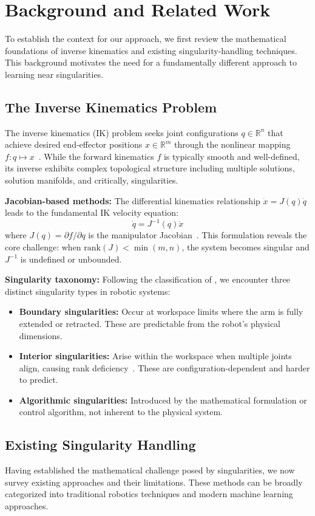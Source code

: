 \documentclass[twoside,11pt]{article}
\begin{document}
\section{Background and Related Work}
\label{sec:background}
To establish the context for our approach, we first review the mathematical foundations of inverse kinematics and existing singularity-handling techniques. This background motivates the need for a fundamentally different approach to learning near singularities.

\subsection{The Inverse Kinematics Problem}
The inverse kinematics (IK) problem seeks joint configurations $q \in \mathbb{R}^n$ that achieve desired end-effector positions $x \in \mathbb{R}^m$ through the nonlinear mapping $f: q \mapsto x$~\citep{siciliano2016robotics}. While the forward kinematics $f$ is typically smooth and well-defined, its inverse exhibits complex topological structure including multiple solutions, solution manifolds, and critically, singularities.

\textbf{Jacobian-based methods:} The differential kinematics relationship $\dot{x} = J(q)\dot{q}$ leads to the fundamental IK velocity equation:
$$\dot{q} = J^{-1}(q)\dot{x}$$
where $J(q) = \partial f/\partial q$ is the manipulator Jacobian~\citep{nakamura1991advanced}. This formulation reveals the core challenge: when $\mathrm{rank}(J) < \min(m,n)$, the system becomes singular and $J^{-1}$ is undefined or unbounded.

\textbf{Singularity taxonomy:} Following the classification of \citet{chiacchio1990review}, we encounter three distinct singularity types in robotic systems:
\begin{itemize}
\item \textbf{Boundary singularities:} Occur at workspace limits where the arm is fully extended or retracted. These are predictable from the robot's physical dimensions.
\item \textbf{Interior singularities:} Arise within the workspace when multiple joints align, causing rank deficiency~\citep{yoshikawa1985manipulability}. These are configuration-dependent and harder to predict.
\item \textbf{Algorithmic singularities:} Introduced by the mathematical formulation or control algorithm, not inherent to the physical system.
\end{itemize}
\subsection{Existing Singularity Handling}
Having established the mathematical challenge posed by singularities, we now survey existing approaches and their limitations. These methods can be broadly categorized into traditional robotics techniques and modern machine learning approaches.
\end{document}
